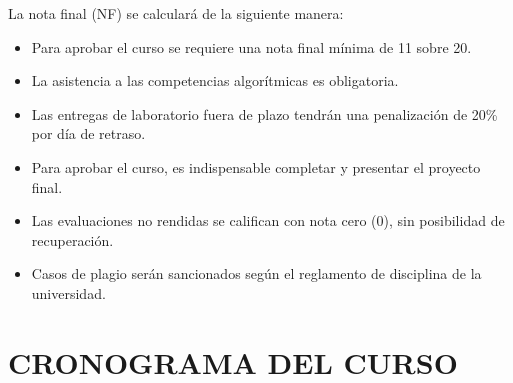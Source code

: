 \documentclass[12pt,a4paper]{article}
\begin{document}
La nota final (NF) se calculará de la siguiente manera:


\begin{tcolorbox}[colback=pucpRojo!5,colframe=pucpRojo,title=\textbf{Políticas de Evaluación}]
\begin{itemize}[leftmargin=*]
    \item Para aprobar el curso se requiere una nota final mínima de 11 sobre 20.
    \item La asistencia a las competencias algorítmicas es obligatoria.
    \item Las entregas de laboratorio fuera de plazo tendrán una penalización de 20\% por día de retraso.
    \item Para aprobar el curso, es indispensable completar y presentar el proyecto final.
    \item Las evaluaciones no rendidas se califican con nota cero (0), sin posibilidad de recuperación.
    \item Casos de plagio serán sancionados según el reglamento de disciplina de la universidad.
\end{itemize}
\end{tcolorbox}
\vspace{0.5cm}

\section{CRONOGRAMA DEL CURSO}
\end{document}
